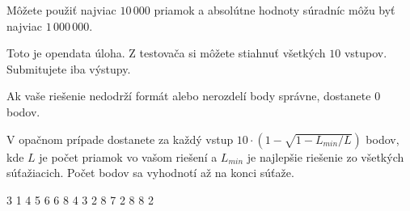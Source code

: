 Môžete použiť najviac $10\,000$ priamok a absolútne hodnoty súradníc môžu byť najviac $1\,000\,000$.

Toto je opendata úloha. Z testovača si môžete stiahnuť všetkých $10$ vstupov.
Submitujete iba výstupy.

Ak vaše riešenie nedodrží formát alebo nerozdelí body správne, dostanete $0$ bodov.

V opačnom prípade dostanete za každý vstup
$ 10 \cdot \left(1 - \sqrt{1 - L_{min} / L}\right)$ bodov,
kde $L$ je počet priamok vo vašom riešení a $L_{min}$ je najlepšie riešenie zo všetkých súťažiacich.
Počet bodov sa vyhodnotí až na konci súťaže.


3 1
4 5
6 6
8 4
3 2 8 7
2 8 8 2
\sampleEND


